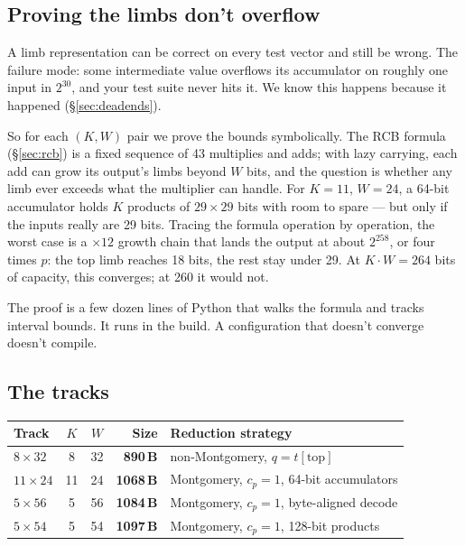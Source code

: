 \documentclass[11pt,a4paper]{article}
\newcommand{\bytes}[1]{\textcolor{blue!60!black}{\textbf{#1\,B}}}
\begin{document}
\subsection{Proving the limbs don't overflow}

A limb representation can be correct on every test vector and still
be wrong. The failure mode: some intermediate value overflows its
accumulator on roughly one input in $2^{30}$, and your test suite
never hits it. We know this happens because it happened
(\S\ref{sec:deadends}).

So for each $(K, W)$ pair we prove the bounds symbolically. The RCB
formula (\S\ref{sec:rcb}) is a fixed sequence of 43 multiplies and
adds; with lazy carrying, each add can grow its output's limbs
beyond $W$ bits, and the question is whether any limb ever exceeds
what the multiplier can handle. For $K = 11$, $W = 24$, a 64-bit
accumulator holds $K$ products of $29 \times 29$ bits with room to
spare --- but only if the inputs really are 29 bits. Tracing the
formula operation by operation, the worst case is a $\times 12$
growth chain that lands the output at about $2^{258}$, or four times
$p$: the top limb reaches 18 bits, the rest stay under 29. At $K
\cdot W = 264$ bits of capacity, this converges; at 260 it would not.

The proof is a few dozen lines of Python that walks the formula and
tracks interval bounds. It runs in the build. A configuration that
doesn't converge doesn't compile.

\subsection{The tracks}

\begin{center}
\begin{tabular}{@{}lccrl@{}}
\toprule
Track & $K$ & $W$ & Size & Reduction strategy \\
\midrule
$8 \times 32$  & 8  & 32 & \bytes{890}  & non-Montgomery, $q=t[\text{top}]$ \\
$11 \times 24$ & 11 & 24 & \bytes{1068} & Montgomery, $c_p = 1$, 64-bit accumulators \\
$5 \times 56$  & 5  & 56 & \bytes{1084} & Montgomery, $c_p = 1$, byte-aligned decode \\
$5 \times 54$  & 5  & 54 & \bytes{1097} & Montgomery, $c_p = 1$, 128-bit products \\
\bottomrule
\end{tabular}
\end{center}
\end{document}
